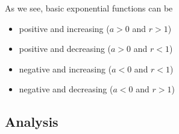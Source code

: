 \documentclass{ximera}
\begin{document}
As we see, basic exponential functions can be

\begin{itemize}
\item positive and increasing ($a>0$ and $r>1$)
\item positive and decreasing ($a>0$ and $r<1$)
\item negative and increasing ($a<0$ and $r<1$)
\item negative and decreasing ($a<0$ and $r>1$)
\end{itemize}













\subsection*{Analysis}
\end{document}
